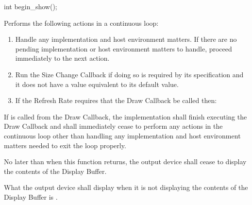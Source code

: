\begin{itemdecl}
int begin_show();
\end{itemdecl}
\begin{itemdescr}
\pnum
\effects
Performs the following actions in a continuous loop:
\begin{enumerate}
	\item Handle any implementation and host environment matters. If there are no pending implementation or host environment matters to handle, proceed immediately to the next action.
	\item Run the Size Change Callback if doing so is required by its specification and it does not have a value equivalent to its default value.
	\item If the Refresh Rate requires that the Draw Callback be called then:
\end{enumerate}

\pnum
If  is called from the Draw Callback, the implementation shall finish executing the Draw Callback and shall immediately cease to perform any actions in the continuous loop other than handling any implementation and host environment matters needed to exit the loop properly.

\pnum
No later than when this function returns, the output device shall cease to display the contents of the Display Buffer.

\pnum
What the output device shall display when it is not displaying the contents of the Display Buffer is \unspecnorm.


\end{itemdescr}

